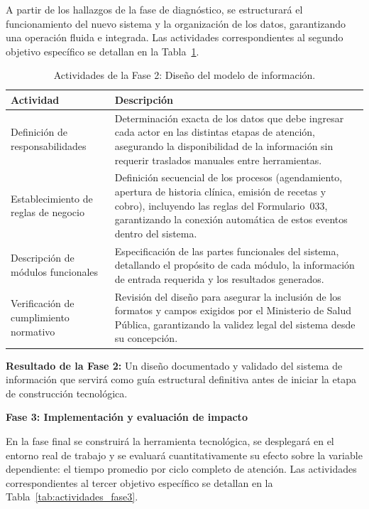 \smallskip
A partir de los hallazgos de la fase de diagnóstico, se
estructurará el funcionamiento del nuevo sistema y la organización
de los datos, garantizando una operación fluida e integrada. Las
actividades correspondientes al segundo objetivo específico se
detallan en la Tabla~\ref{tab:actividades_fase2}.

\begin{table}[H]
\centering
\begin{tabular}{|p{4.5cm}|p{9cm}|}
\hline
\textbf{Actividad} & \textbf{Descripción} \\ \hline
Definición de
responsabilidades
  & Determinación exacta de los datos que debe ingresar cada
    actor en las distintas etapas de atención, asegurando la
    disponibilidad de la información sin requerir traslados
    manuales entre herramientas. \\ \hline
Establecimiento de
reglas de negocio
  & Definición secuencial de los procesos (agendamiento,
    apertura de historia clínica, emisión de recetas y cobro),
    incluyendo las reglas del Formulario~033, garantizando la
    conexión automática de estos eventos dentro del sistema. \\ \hline
Descripción de módulos
funcionales
  & Especificación de las partes funcionales del sistema,
    detallando el propósito de cada módulo, la información de
    entrada requerida y los resultados generados. \\ \hline
Verificación de
cumplimiento normativo
  & Revisión del diseño para asegurar la inclusión de los
    formatos y campos exigidos por el Ministerio de Salud
    Pública, garantizando la validez legal del sistema desde
    su concepción. \\ \hline
\end{tabular}
\caption{Actividades de la Fase 2: Diseño del modelo de
         información.}
\label{tab:actividades_fase2}
\end{table}

\noindent\textbf{Resultado de la Fase 2:} Un diseño documentado
y validado del sistema de información que servirá como guía
estructural definitiva antes de iniciar la etapa de construcción
tecnológica.

\bigskip
\noindent\textbf{Fase 3: Implementación y evaluación de impacto}

\smallskip
En la fase final se construirá la herramienta tecnológica, se
desplegará en el entorno real de trabajo y se evaluará
cuantitativamente su efecto sobre la variable dependiente: el
tiempo promedio por ciclo completo de atención. Las actividades
correspondientes al tercer objetivo específico se detallan en la
Tabla~\ref{tab:actividades_fase3}.

